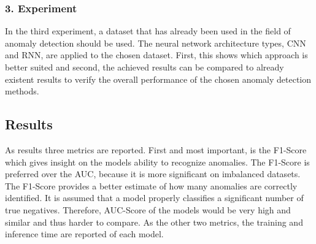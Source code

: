 \subsubsection{3. Experiment}
In the third experiment, a dataset that has already been used in the field of anomaly detection should be used. The neural network architecture types, CNN and RNN, are applied to the chosen dataset. First, this shows which approach is better suited and second, the achieved results can be compared to already existent results to verify the overall performance of the chosen anomaly detection methods.

\subsection{Results}
As results three metrics are reported. First and most important, is the F1-Score which gives insight on the models ability to recognize anomalies. The F1-Score is preferred over the AUC, because it is more significant on imbalanced datasets. The F1-Score provides a better estimate of how many anomalies are correctly identified. It is assumed that a model properly classifies a significant number of true negatives. Therefore, AUC-Score of the models would be very high and similar and thus harder to compare. As the other two metrics, the training and inference time are reported of each model.



 